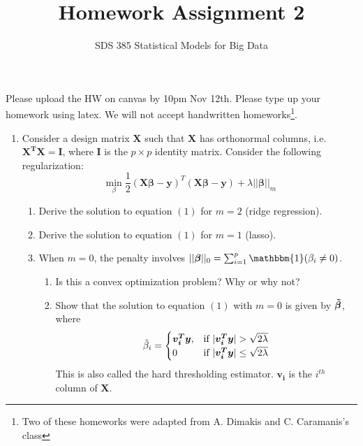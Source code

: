 \documentclass[11pt]{article}
\newcommand{\bi}{\begin{enumerate}}
\newcommand{\ib}{\end{enumerate}}
\newcommand{\p}{\item}
\newcommand{\bm}[1]{\boldsymbol{#1}}
\begin{document}
\title{{\bf Homework Assignment 2}}
\author{SDS 385 Statistical Models for Big Data}

\date{}

\maketitle{}
Please upload the HW on canvas by 10pm Nov 12th. Please type up your homework using latex. We will not accept handwritten homeworks\footnote{Two of these homeworks were adapted from A. Dimakis and C. Caramanis's class}. 

\begin{enumerate}%
\p Consider a design matrix $\bm{X}$ such that $\bm{X}$ has orthonormal columns, i.e.
$\bm{X^T X} = \bm{I}$, where $\bm{I}$ is the $p \times p$ identity matrix. Consider the following regularization:
\begin{equation}
\underset{\beta}{\min}\frac{1}{2}(\bm{X\beta-y})^T(\bm{X\beta-y})+\lambda||\bm{\beta}||_m
\end{equation} %

\bi
\p Derive the solution to equation $(1)$ for $m=2$ (ridge regression).
\p Derive the solution to equation $(1)$ for $m=1$ (lasso).
\p When $m=0$, the penalty involves $||\bm{\bm{\beta}}||_0 = \sum_{i=1}^p \mathbbm{1}(\beta_i\neq 0)$. 
\bi
\p Is this a convex optimization problem? Why or why not?
\p Show that the solution to equation $(1)$ with $m=0$ is given by $\bm{\Tilde{\beta}}$, where
\[
\Tilde{\beta}_i = 
\begin{cases}
\bm{v_i^T y},& \text{if } |\bm{v_i^T y}|>\sqrt{2\lambda}\\
0            & \text{if } |\bm{v_i^T y}|\leq\sqrt{2\lambda}
\end{cases}
\]
This is also called the hard thresholding estimator. $\bm{v_i}$ is the $i^{th}$ column of $\bm{X}$.
\ib
\ib


\end{enumerate}
\end{document}
